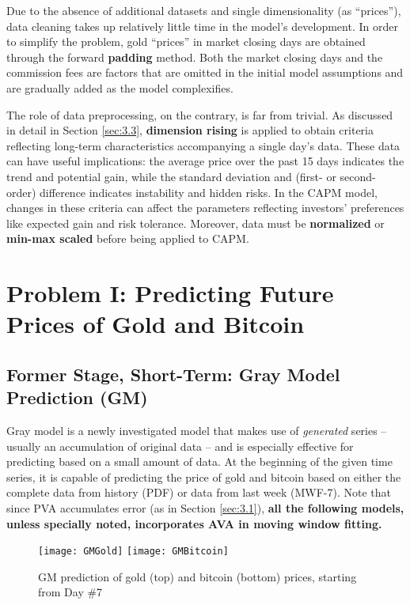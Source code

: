 \documentclass{mcmthesis}
\begin{document}
{	Due to the absence of additional datasets and single dimensionality (as ``prices''), data cleaning takes up relatively little time in the model's development. In order to simplify the problem, gold ``prices'' in market closing days are obtained through the forward \textbf{padding} method. Both the market closing days and the commission fees are factors that are omitted in the initial model assumptions and are gradually added as the model complexifies. 
	
	The role of data preprocessing, on the contrary, is far from trivial. As discussed in detail in Section \ref{sec:3.3}, \textbf{dimension rising} is applied to obtain criteria reflecting long-term characteristics accompanying a single day's data. These data can have useful implications: the average price over the past 15 days indicates the trend and potential gain, while the standard deviation and (first- or second-order) difference indicates instability and hidden risks. In the CAPM model, changes in these criteria can affect the parameters reflecting investors' preferences like expected gain and risk tolerance. Moreover, data must be \textbf{normalized} or \textbf{min-max scaled} before being applied to CAPM. 
		
	\newpage
	\section{Problem I: Predicting Future Prices of Gold and Bitcoin}
	
	\subsection{Former Stage, Short-Term: Gray Model Prediction (GM)}
	
	Gray model is a newly investigated model that makes use of \textit{generated} series -- usually an accumulation of original data -- and is especially effective for predicting based on a small amount of data. At the beginning of the given time series, it is capable of predicting the price of gold and bitcoin based on either the complete data from history (PDF) or data from last week (MWF-7). Note that since PVA accumulates error (as in Section \ref{sec:3.1}), \textbf{all the following models, unless specially noted, incorporates AVA in moving window fitting.}
	
	\begin{figure}[h]
		\label {fig:3}
		\centering \texttt{[image: GMGold]}
		\centering \texttt{[image: GMBitcoin]}
		\caption{GM prediction of gold (top) and bitcoin (bottom) prices, starting from Day \#7}
	\end{figure}
	
}
\end{document}
